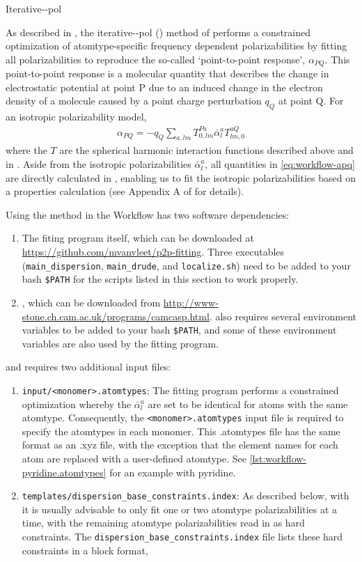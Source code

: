 \begin{subsubsection}{Iterative-\dma-pol}
\label{sec:workflow-jesse}

As described in , the iterative-\dma-pol (\idma) method of
\citeauthor{McDaniel2013} performs a constrained optimization of
atomtype-specific frequency dependent polarizabilities by fitting all
polarizabilities to reproduce the so-called `point-to-point response',
$\alpha_{PQ}$. This point-to-point response is a
molecular quantity that
describes the change in electrostatic potential at point P due to an induced
change in the electron density of a molecule caused by a point charge
perturbation $q_Q$ at point Q. For an isotropic polarizability model,
%
\begin{align}
\label{eq:workflow-apq}
\alpha_{PQ} = -q_Q \sum\limits_{a,lm} T^{Pa}_{0,lm} \bar{\alpha}^a_l T^{aQ}_{lm,0}
\end{align}
%
where the $T$ are the spherical harmonic interaction functions described above and in
. Aside from the isotropic polarizabilities
$\bar{\alpha}^a_l$, all quantities in \cref{eq:workflow-apq} are directly
calculated in \camcasp, enabling us to fit
the isotropic polarizabilities based on a \camcasp properties calculation (see
Appendix A of  for details).

Using the \idma method in the Workflow has two software dependencies: 
\begin{enumerate}
\item The \idma fiting program itself, which can be downloaded at
\url{https://github.com/mvanvleet/p2p-fitting}. Three executables
(\verb|main_dispersion|, \verb|main_drude|, and \verb|localize.sh|) need to be added to your bash
\verb|$PATH| for the scripts listed in this section to work properly.
%
\item \camcasp, which can be downloaded from 
\url{http://www-stone.ch.cam.ac.uk/programs/camcasp.html}. \camcasp also
requires several environment variables to be added to your bash \verb|$PATH|, and some of these
environment variables are also used by the \idma fitting program.
%
\end{enumerate}
and requires two additional input files:
\begin{enumerate}
\item \verb|input/<monomer>.atomtypes|: The \idma fitting program performs
a constrained optimization whereby the $\bar{\alpha}^a_l$ are set to be
identical for atoms with the same atomtype. Consequently, the
\verb|<monomer>.atomtypes| input file is required to specify the atomtypes in
each monomer. This .atomtypes file has the same
format as an .xyz file, with the exception that the element names for each atom
are replaced with a user-defined atomtype. See
\cref{lst:workflow-pyridine.atomtypes} for an example with pyridine.
%
\item \verb|templates/dispersion_base_constraints.index|: As described below,
with \idma it is usually advisable to only fit one or two atomtype polarizabilities at a
time, with the remaining atomtype polarizabilities read in as hard
constraints. The \verb|dispersion_base_constraints.index| file lists these
hard constraints in a block format, 


\end{enumerate}
\end{subsubsection}
